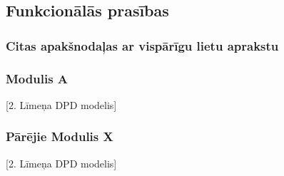 \subsection{Funkcionālās prasības}

\subsubsection{Citas apakšnodaļas ar vispārīgu lietu aprakstu}


\subsubsection{Modulis A}
[2. Līmeņa DPD modelis]
\subsubsection{Pārējie Modulis X}
[2. Līmeņa DPD modelis]

